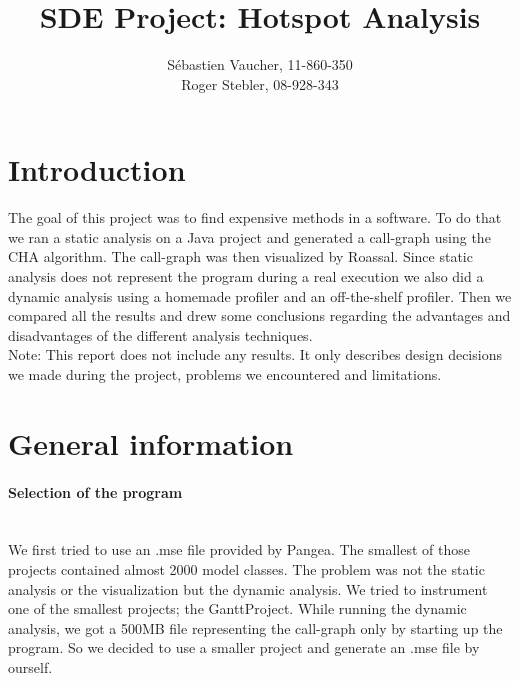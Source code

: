 \documentclass{paper}
\title{SDE Project: Hotspot Analysis}
\author{S\'{e}bastien Vaucher, 11-860-350\\Roger Stebler, 08-928-343}
\begin{document}
\maketitle


%

\section{Introduction}
The goal of this project was to find expensive methods in a software. To do that we ran a static analysis on a Java project and generated a call-graph using the CHA algorithm. The call-graph was then visualized by Roassal. Since static analysis does not represent the program during a real execution we also did a dynamic analysis using a homemade profiler and an off-the-shelf profiler. Then we compared all the results and drew some conclusions regarding the advantages and disadvantages of the different analysis techniques.\\


Note: This report does not include any results. It only describes design decisions we made during the project, problems we encountered and limitations.

\section{General information}

\paragraph{Selection of the program}\mbox{}\vspace{10pt}\\
We first tried to use an .mse file provided by Pangea. The smallest of those projects contained almost 2000 model classes. The problem was not the static analysis or the visualization but the dynamic analysis. We tried to instrument one of the smallest projects; the GanttProject. While running the dynamic analysis, we got a 500MB file representing the call-graph only by starting up the program. So we decided to use a smaller project and generate an .mse file by ourself.
\end{document}
